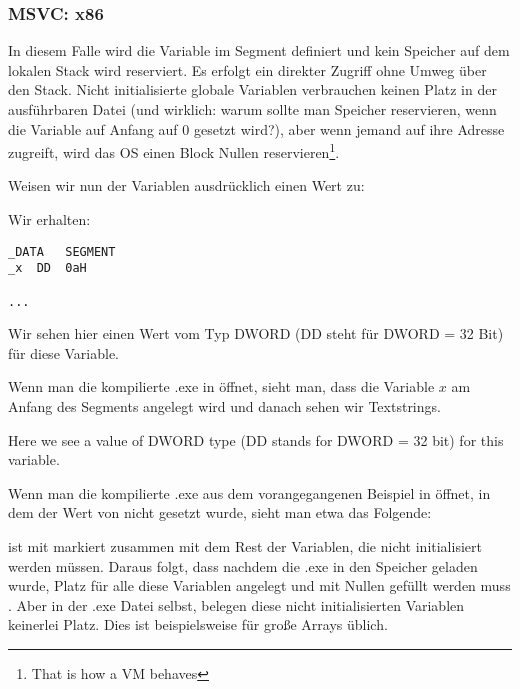 \subsubsection{MSVC: x86}


In diesem Falle wird die Variable  im  Segment definiert und kein Speicher auf dem lokalen Stack wird
reserviert. Es erfolgt ein direkter Zugriff ohne Umweg über den Stack.
Nicht initialisierte globale Variablen verbrauchen keinen Platz in der ausführbaren Datei (und wirklich: warum sollte
man Speicher reservieren, wenn die Variable auf Anfang auf 0 gesetzt wird?), aber wenn jemand auf ihre Adresse zugreift,
wird das \ac{OS} einen Block Nullen reservieren\footnote{That is how a \ac{VM} behaves}.

Weisen wir nun der Variablen ausdrücklich einen Wert zu:



Wir erhalten:

\begin{lstlisting}[style=customasmx86]
_DATA	SEGMENT
_x	DD	0aH

...
\end{lstlisting}

Wir sehen hier einen Wert  vom Typ DWORD (DD steht für DWORD = 32 Bit) für diese Variable.

Wenn man die kompilierte .exe in \IDA öffnet, sieht man, dass die Variable $x$ am Anfang des  Segments
angelegt wird und danach sehen wir Textstrings. 

Here we see a value  of DWORD type (DD stands for DWORD = 32 bit) for this variable.

Wenn man die kompilierte .exe aus dem vorangegangenen Beispiel in \IDA öffnet, in dem der Wert von  nicht gesetzt
wurde, sieht man etwa das Folgende:



\label{BSSClearedByCStd}
 ist mit  markiert zusammen mit dem Rest der Variablen, die nicht initialisiert werden müssen.
Daraus folgt, dass nachdem die .exe in den Speicher geladen wurde, Platz für alle diese Variablen angelegt und mit
Nullen gefüllt werden muss .
Aber in der .exe Datei selbst, belegen diese nicht initialisierten Variablen keinerlei Platz. 
Dies ist beispielsweise für große Arrays üblich.

